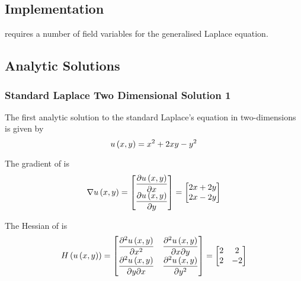 \subsection{\OpenCMISS Implementation}

\OpenCMISS requires a number of field variables for the generalised Laplace equation. 

\subsection{Analytic Solutions}

\subsubsection{Standard Laplace Two Dimensional Solution 1}

The first analytic solution to the standard Laplace's equation in two-dimensions is given by
\begin{equation}
  \fnof{u}{x,y}=x^{2}+2xy-y^{2}
  \label{eqn:StandardLaplaceTwoDAnalytic1}
\end{equation}

The gradient of  is
\begin{equation}
  \gradient{}{\fnof{u}{x,y}}=\begin{bmatrix}
  \delby{\fnof{u}{x,y}}{x} \\
  \delby{\fnof{u}{x,y}}{y}
  \end{bmatrix}=\begin{bmatrix}
  2x+2y \\
  2x-2y
  \end{bmatrix}
  \label{eqn:StandardLaplaceTwoDAnalyticGradient1}
\end{equation}

The Hessian of  is
\begin{equation}
  \hessian{}{\fnof{u}{x,y}}=\begin{bmatrix}
  \deltwosqby{\fnof{u}{x,y}}{x} & \deltwoby{\fnof{u}{x,y}}{x}{y} \\
  \deltwoby{\fnof{u}{x,y}}{y}{x} & \deltwosqby{\fnof{u}{x,y}}{y}
  \end{bmatrix}=\begin{bmatrix}
  2 & 2 \\
  2 & -2
  \end{bmatrix}
  \label{eqn:StandardLaplaceTwoDAnalyticHessian1}
\end{equation}

